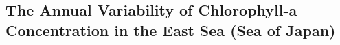 \newpage
 
\subsection{The Annual Variability of Chlorophyll-a Concentration in the East Sea (Sea of Japan)}
 






